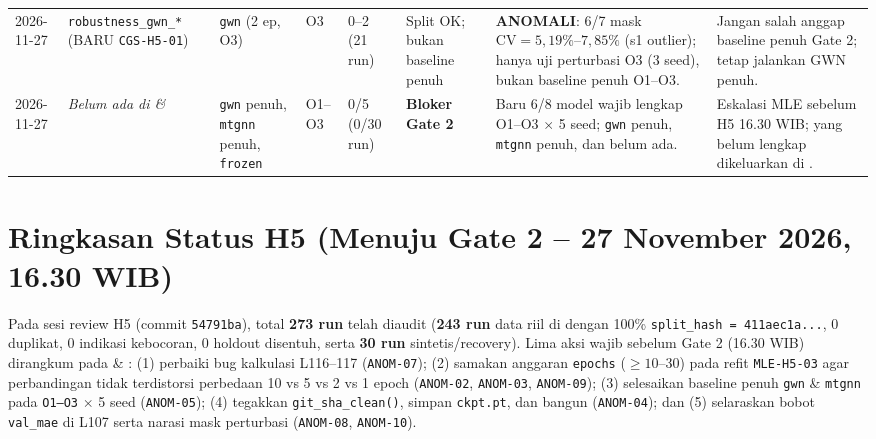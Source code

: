 \documentclass[11pt,a4paper]{article}
\begin{document}
\begin{longtable}{@{}C{1.3cm}L{2.5cm}L{1.4cm}C{0.9cm}C{0.9cm}L{1.4cm}L{3.2cm}L{2.5cm}@{}}
2026-11-27 & \texttt{robustness\_gwn\_*} (BARU \texttt{CGS-H5-01}) & \texttt{gwn} (2 ep, O3) & O3 & 0--2 (21 run) & Split OK; bukan baseline penuh & \textbf{ANOMALI}: 6/7 mask $\text{CV}=5{,}19\%$--$7{,}85\%$ (s1 outlier); hanya uji perturbasi O3 (3 seed), bukan baseline penuh O1--O3. & Jangan salah anggap baseline penuh Gate 2; tetap jalankan GWN penuh. \\
2026-11-27 & \textit{Belum ada di  \& } & \texttt{gwn} penuh, \texttt{mtgnn} penuh, \texttt{frozen} & O1--O3 & 0/5 (0/30 run) & \textbf{Bloker Gate 2} & Baru 6/8 model wajib lengkap O1--O3 $\times$ 5 seed; \texttt{gwn} penuh, \texttt{mtgnn} penuh, dan  belum ada. & Eskalasi MLE sebelum H5 16.30 WIB; yang belum lengkap dikeluarkan di . \\
\bottomrule
\end{longtable}
\endgroup

\section{Ringkasan Status H5 (Menuju Gate 2 -- 27 November 2026, 16.30 WIB)}
Pada sesi review H5 (commit \texttt{54791ba}), total \textbf{273 run} telah diaudit
(\textbf{243 run} data riil di  dengan 100\%
\texttt{split\_hash = 411aec1a...}, 0 duplikat, 0 indikasi kebocoran, 0 holdout disentuh,
serta \textbf{30 run} sintetis/recovery). Lima aksi wajib sebelum Gate 2 (16.30 WIB)
dirangkum pada  \& :
(1) perbaiki bug kalkulasi  L116--117 (\texttt{ANOM-07});
(2) samakan anggaran \texttt{epochs} ($\ge 10$--$30$) pada refit \texttt{MLE-H5-03} agar perbandingan
tidak terdistorsi perbedaan 10 vs 5 vs 2 vs 1 epoch (\texttt{ANOM-02}, \texttt{ANOM-03}, \texttt{ANOM-09});
(3) selesaikan baseline penuh \texttt{gwn} \& \texttt{mtgnn} pada \texttt{O1--O3} $\times$ 5 seed (\texttt{ANOM-05});
(4) tegakkan \texttt{git\_sha\_clean()}, simpan \texttt{ckpt.pt}, dan bangun  (\texttt{ANOM-04});
dan (5) selaraskan bobot \texttt{val\_mae} di  L107 serta narasi mask perturbasi (\texttt{ANOM-08}, \texttt{ANOM-10}).
\end{document}
